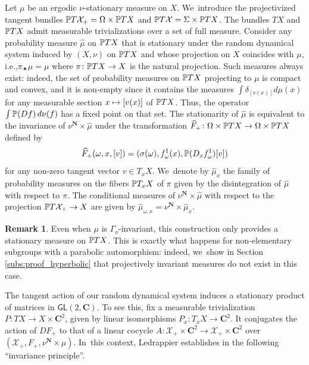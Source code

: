 \documentclass[11pt]{article}
\newcommand{\ie}{i.e.,\xspace}
\newcommand\mto{\mathchoice{\longmapsto}{\mapsto}{\mapsto}{\mapsto}}
\def\C{\mathbf{C}}
\def\N{\mathbf{N}}
\newcommand{\cX}{\mathcal{X}}
\newcommand\GL{{\mathsf{GL}}}
\theoremstyle{plain}
\theoremstyle{definition}
\newtheorem{rem}[thm]{Remark}
\numberwithin{equation}{section}
\begin{document}
Let $\mu$ be an ergodic $\nu$-stationary measure on $X$. We~introduce the projectivized tangent bundles $\P T \cX_+ = \Omega \times \P TX$ and $\P T\cX = \Sigma\times \P TX$. The bundles $TX$ and $\P TX$ admit measurable trivializations over a set of full measure.
Consider any probability measure $\hat\mu$ on $\P TX$ that is stationary under the random dynamical system induced by $(X,\nu)$ on $\P TX$
and whose projection on $X$ coincides with $\mu$, \ie $\pi_\varstar \hat\mu= \mu $ where $\pi\colon \P TX\to X$ is the natural projection.
Such measures always exist: indeed,
the set of probability measures on $\P TX$ projecting to $\mu$ is compact and convex, and it is non-empty since it contains
the measures $\int \delta_{[v(x)]} d\mu(x)$ for any measurable section
$x\mto [v(x)]$ of $\P TX$. Thus, the operator $\int \P (Df) \,d\nu(f)$ has a fixed point on that set. The stationarity of $\hat\mu$ is equivalent to the invariance of $\nu^\N\times \hat\mu$
under the transformation ${\widehat{F}_+}\colon \Omega\times \P TX\to \Omega\times \P TX$ defined by
\begin{equation*}
{\widehat{F}_+}(\omega, x, [v])= (\sigma(\omega), f^1_\omega(x), \P(D_xf^1_\omega)[v])
\end{equation*}
for any non-zero tangent vector $v\in T_xX$. We~denote by $\hat\mu_x$ the family of probability measures
on the fibers $\P T_x X$ of $\pi$
given by the disintegration of $\hat\mu$ with respect to $\pi$.
The conditional measures of $\nu^\N\times\hat\mu$ with respect to the projection
$\P T\cX_+\to X$ are given by $\hat\mu_{\omega,x} = \nu^\N\times \hat\mu_x$.

\begin{rem}
Even when $\mu$ is $\Gamma_\nu$-invariant, this construction only provides a stationary measure on
$\P TX$. This is exactly what happens for non-elementary subgroups with a parabolic automorphism:
indeed, we~show in Section \ref{subs:proof_hyperbolic} that projectively invariant measures do not exist in this case.
\end{rem}

The tangent action of our random dynamical system induces a stationary product of
matrices in $\GL(2, \C)$. To see this, fix a measurable trivialization $P\colon TX\to X\times \C^2$, given
by linear isomorphisms $P_x\colon T_xX\to \C^2$. It conjugates the action of $DF_+$ to that of a linear
cocycle $A:\cX_+ \times \C^2\to \cX_+ \times \C^2$ over $(\cX_+, F_+, \nu^\N\times \mu)$. In~this context,
Ledrappier establishes in \cite{ledrappier_stationary}
the following ``invariance principle''.
\end{document}
